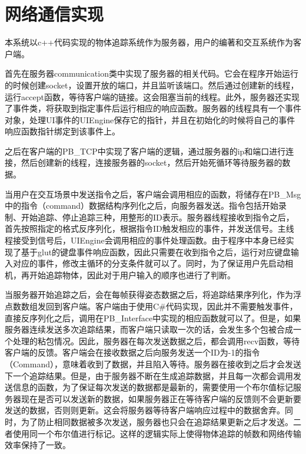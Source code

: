 \section{网络通信实现}

本系统以c++代码实现的物体追踪系统作为服务器，用户的编著和交互系统作为客户端。

首先在服务器communication类中实现了服务器的相关代码。它会在程序开始运行的时候创建socket，设置开放的端口，并且监听该端口。然后通过创建新的线程，运行accept函数，等待客户端的链接。这会阻塞当前的线程。此外，服务器还实现了事件类，将获取到指定事件后运行相应的响应函数。服务器的线程具有一个事件对象，处理UI事件的UIEngine保存它的指针，并且在初始化的时候将自己的事件响应函数指针绑定到该事件上。

之后在客户端的PB\_TCP中实现了客户端的逻辑，通过服务器的ip和端口进行连接，然后创建新的线程，连接服务器的socket，然后开始死循环等待服务器的数据。

当用户在交互场景中发送指令之后，客户端会调用相应的函数，将储存在PB\_Msg中的指令（command）数据结构序列化之后，向服务器发送。指令包括开始录制、开始追踪、停止追踪三种，用整形的ID表示。服务器线程接收到指令之后，首先按照指定的格式反序列化，根据指令ID触发相应的事件，并发送信号。主线程接受到信号后，UIEngine会调用相应的事件处理函数。由于程序中本身已经实现了基于glut的键盘事件响应函数，因此只需要在收到指令之后，运行对应键盘输入对应的事件，修改主循环的分支条件就可以了。同时，为了保证用户先启动相机，再开始追踪物体，因此对于用户输入的顺序也进行了判断。

当服务器开始追踪之后，会在每帧获得姿态数据之后，将追踪结果序列化，作为浮点数数组发回到客户端。客户端由于使用C\#代码实现，因此并不需要触发事件，直接反序列化之后，调用在PB\_Interface中实现的相应函数就可以了。但是，如果服务器连续发送多次追踪结果，而客户端只读取一次的话，会发生多个包被合成一个处理的粘包情况。因此，服务器在每次发送数据之后，都会调用recv函数，等待客户端的反馈。客户端会在接收数据之后向服务发送一个ID为-1的指令（Command），意味着收到了数据，并且陷入等待。服务器在接收到之后才会发送下一个追踪结果。但是，由于服务器不断在生成追踪数据，并且每一次都会调用发送信息的函数，为了保证每次发送的数据都是最新的，需要使用一个布尔值标记服务器现在是否可以发送新的数据，如果服务器正在等待客户端的反馈则不会更新要发送的数据，否则则更新。这会将服务器等待客户端响应过程中的数据舍弃。同时，为了防止相同数据被多次发送，服务器也只会在追踪结果更新之后才发送。二者使用同一个布尔值进行标记。这样的逻辑实际上使得物体追踪的帧数和网络传输效率保持了一致。

